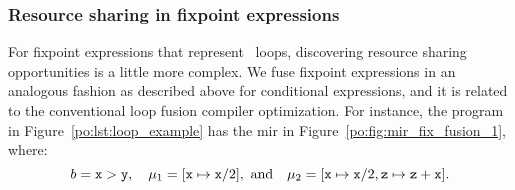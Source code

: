 \subsubsection{Resource sharing in fixpoint expressions}

For fixpoint expressions that represent \whilelit~loops, discovering resource
sharing opportunities is a little more complex.  We fuse fixpoint expressions
in an analogous fashion as described above for conditional expressions, and
it is related to the conventional loop fusion compiler optimization.  For
instance, the program in Figure~\ref{po:lst:loop_example} has the \gls{mir}
in Figure~\ref{po:fig:mir_fix_fusion_1}, where:
\begin{equation}
    b = \texttt{x} > \texttt{y}, \quad
    \mu_1 = [\texttt{x} \mapsto \texttt{x} / 2], \text{~and} \quad
    \mu_2 = [\texttt{x} \mapsto \texttt{x} / 2, \texttt{z} \mapsto \texttt{z} + \texttt{x}].
\end{equation}

